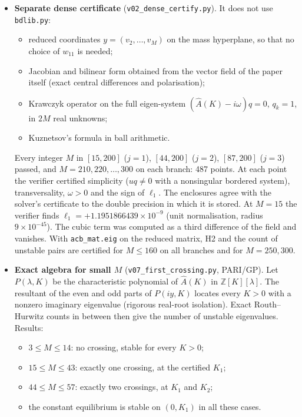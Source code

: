 \documentclass[11pt,a4paper]{report}
\begin{document}
\begin{itemize}
\tightlist
\item
  \textbf{Separate dense certificate} (\texttt{v02\_dense\_certify.py}). It does not use \texttt{bdlib.py}:
  \begin{itemize}
  \tightlist
  \item reduced coordinates \(y=(v_2,\dots,v_M)\) on the mass hyperplane, so that no choice of \(w_{11}\) is needed;
  \item Jacobian and bilinear form obtained from the vector field of the paper itself (exact central differences and
  polarisation);
  \item Krawczyk operator on the full eigen-system \((\hat A(K)-i\omega)q=0\), \(q_k=1\), in \(2M\) real unknowns;
  \item Kuznetsov's formula in ball arithmetic.
  \end{itemize}
  Every integer \(M\) in \([15,200]\) (\(j=1\)), \([44,200]\) (\(j=2\)), \([87,200]\) (\(j=3\)) passed, and
  \(M=210,220,\dots,300\) on each branch: 487 points. At each point the verifier certified simplicity
  (\(uq\ne0\) with a nonsingular bordered system), transversality, \(\omega>0\) and the sign of \(\ell_1\). The
  enclosures agree with the solver's certificate to the double precision in which it is stored. At \(M=15\) the
  verifier finds
  \(\ell_1=+1.1951866439\times10^{-9}\) (unit normalisation, radius \(9\times10^{-45}\)). The cubic term was computed
  as a third difference of the field and vanishes. With \texttt{acb\_mat.eig} on the reduced matrix, H2 and the count
  of unstable pairs are certified for \(M\le160\) on all branches and for \(M=250,300\).
\item
  \textbf{Exact algebra for small \(M\)} (\texttt{v07\_first\_crossing.py}, PARI/GP). Let \(P(\lambda,K)\) be the
  characteristic polynomial of \(\hat A(K)\) in \(\mathbb Z[K][\lambda]\). The resultant of the even and odd parts of
  \(P(iy,K)\) locates every \(K>0\) with a nonzero imaginary eigenvalue (rigorous real-root isolation). Exact
  Routh--Hurwitz counts in between then give the number of unstable eigenvalues. Results:
  \begin{itemize}
  \tightlist
  \item \(3\le M\le14\): no crossing, stable for every \(K>0\);
  \item \(15\le M\le43\): exactly one crossing, at the certified \(K_1\);
  \item \(44\le M\le57\): exactly two crossings, at \(K_1\) and \(K_2\);
  \item the constant equilibrium is stable on \((0,K_1)\) in all these cases.

\end{itemize}
\end{itemize}
\end{document}
